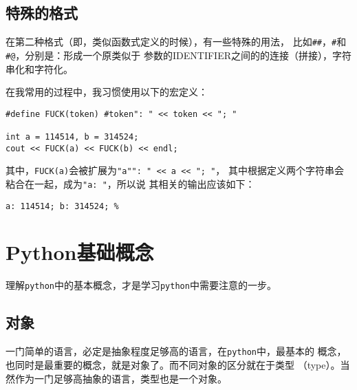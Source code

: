 \subsection{特殊的格式}

在第二种格式（即，类似函数式定义的时候），有一些特殊的用法，
比如\verb|##|，\verb|#|和\verb|#@|，分别是：形成一个原类似于
参数的IDENTIFIER之间的的连接（拼接），字符串化和字符化。

在我常用的过程中，我习惯使用以下的宏定义：
\begin{lstlisting}
#define FUCK(token) #token": " << token << "; "

int a = 114514, b = 314524;
cout << FUCK(a) << FUCK(b) << endl;
\end{lstlisting}

其中，\verb|FUCK(a)|会被扩展为\verb|"a"": " << a << "; "|，
其中根据定义两个字符串会粘合在一起，成为\verb|"a: "|，所以说
其相关的输出应该如下：
\begin{lstlisting}
a: 114514; b: 314524; %
\end{lstlisting}


\section{Python基础概念}

\def\pyth{\verb|python|}

理解\pyth 中的基本概念，才是学习\pyth 中需要注意的一步。

\subsection{对象}

一门简单的语言，必定是抽象程度足够高的语言，在\pyth 中，最基本的
概念，也同时是最重要的概念，就是对象了。而不同对象的区分就在于类型
（type）。当然作为一门足够高抽象的语言，类型也是一个对象。

